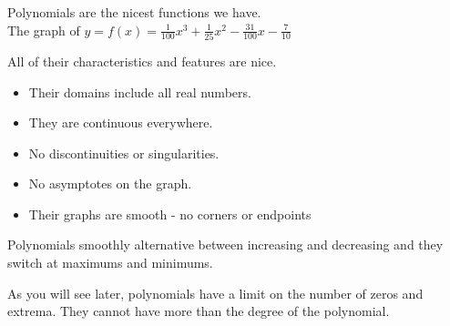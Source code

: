 \documentclass{ximera}
\begin{document}
Polynomials are the nicest functions we have. \\

The graph of $y = f(x) = \frac{1}{100} x^3 + \frac{1}{25} x^2 - \frac{31}{100} x - \frac{7}{10}$

\begin{image}
\end{image}



All of their characteristics and features are nice.

\begin{itemize}
\item Their domains include all real numbers. 
\item They are continuous everywhere.
\item No discontinuities or singularities.
\item No asymptotes on the graph.
\item Their graphs are smooth - no corners or endpoints
\end{itemize}


Polynomials smoothly alternative between increasing and decreasing and they switch at maximums and minimums.

As you will see later, polynomials have a limit on the number of zeros and extrema.  They cannot have more than the degree of the polynomial. 
\end{document}
